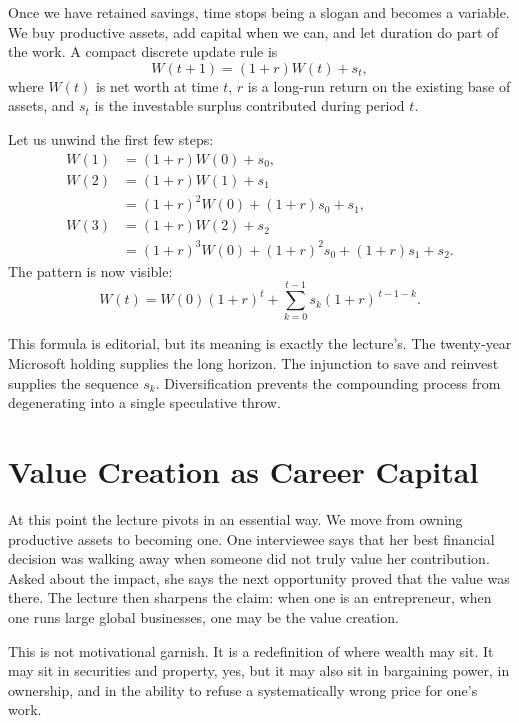 Once we have retained savings, time stops being a slogan and becomes a variable. We buy productive assets, add capital when we can, and let duration do part of the work. A compact discrete update rule is
\begin{equation}
W(t+1)=(1+r)W(t)+s_t,
\end{equation}
where $W(t)$ is net worth at time $t$, $r$ is a long-run return on the existing base of assets, and $s_t$ is the investable surplus contributed during period $t$.

Let us unwind the first few steps:
\begin{align}
W(1) &= (1+r)W(0)+s_0,\\
W(2) &= (1+r)W(1)+s_1 \\
     &= (1+r)^2W(0) + (1+r)s_0 + s_1,\\
W(3) &= (1+r)W(2)+s_2 \\
     &= (1+r)^3W(0) + (1+r)^2s_0 + (1+r)s_1 + s_2.
\end{align}
The pattern is now visible:
\begin{equation}
W(t)=W(0)(1+r)^t+\sum_{k=0}^{t-1}s_k(1+r)^{\,t-1-k}.
\end{equation}

This formula is editorial, but its meaning is exactly the lecture's. The twenty-year Microsoft holding supplies the long horizon. The injunction to save and reinvest supplies the sequence $s_k$. Diversification prevents the compounding process from degenerating into a single speculative throw.

\section{Value Creation as Career Capital}

At this point the lecture pivots in an essential way. We move from owning productive assets to becoming one. One interviewee says that her best financial decision was walking away when someone did not truly value her contribution. Asked about the impact, she says the next opportunity proved that the value was there. The lecture then sharpens the claim: when one is an entrepreneur, when one runs large global businesses, one may be the value creation.

This is not motivational garnish. It is a redefinition of where wealth may sit. It may sit in securities and property, yes, but it may also sit in bargaining power, in ownership, and in the ability to refuse a systematically wrong price for one's work.


